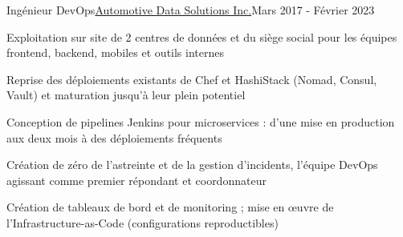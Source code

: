 \begin{joblong}{Ingénieur DevOps}{\href{https://www.adsdata.ca}{Automotive Data Solutions Inc.}}{Mars 2017 - Février 2023}
\item Exploitation sur site de 2 centres de données et du siège social pour les équipes frontend, backend, mobiles et outils internes
\item Reprise des déploiements existants de Chef et HashiStack (Nomad, Consul, Vault) et maturation jusqu'à leur plein potentiel
\item Conception de pipelines Jenkins pour microservices : d'une mise en production aux deux mois à des déploiements fréquents
\item Création de zéro de l'astreinte et de la gestion d'incidents, l'équipe DevOps agissant comme premier répondant et coordonnateur
\item Création de tableaux de bord et de monitoring ; mise en œuvre de l'Infrastructure-as-Code (configurations reproductibles)
\end{joblong}
